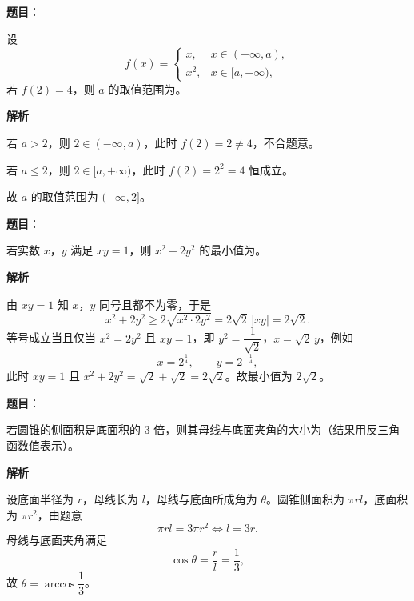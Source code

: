 \begin{answer}

\textbf{题目}：

设
\nopagebreak[4]
\[f(x)=\begin{cases}
x, & x\in(-\infty,a),\\
x^2, & x\in[a,+\infty),
\end{cases}\]
若 $f(2)=4$，则 $a$ 的取值范围为\gkblank{}。

\textbf{解析}

若 $a>2$，则 $2\in(-\infty,a)$，此时 $f(2)=2\neq4$，不合题意。

若 $a\leqslant2$，则 $2\in[a,+\infty)$，此时 $f(2)=2^2=4$ 恒成立。

故 $a$ 的取值范围为 $(-\infty,2]$。

\gkanswer{答案：$(-\infty,2]$。$a\leqslant2$ 时 $2\in[a,+\infty)$，$f(2)=2^2=4$；$a>2$ 时 $f(2)=2\neq4$。}

\end{answer}
\begin{answer}

\textbf{题目}：

若实数 $x$，$y$ 满足 $xy=1$，则 $x^2+2y^2$ 的最小值为\gkblank{}。

\textbf{解析}

由 $xy=1$ 知 $x$，$y$ 同号且都不为零，于是
\nopagebreak[4]
\[x^2+2y^2\geqslant2\sqrt{x^2\cdot2y^2}=2\sqrt2\,|xy|=2\sqrt2 .\]
等号成立当且仅当 $x^2=2y^2$ 且 $xy=1$，即 $y^2=\dfrac1{\sqrt2}$，$x=\sqrt2\,y$，例如
\nopagebreak[4]
\[x=2^{\frac14},\qquad y=2^{-\frac14},\]
此时 $xy=1$ 且 $x^2+2y^2=\sqrt2+\sqrt2=2\sqrt2$。故最小值为 $2\sqrt2$。


\end{answer}
\begin{answer}

\textbf{题目}：

若圆锥的侧面积是底面积的 $3$ 倍，则其母线与底面夹角的大小为\gkblank{}（结果用反三角函数值表示）。

\textbf{解析}

设底面半径为 $r$，母线长为 $l$，母线与底面所成角为 $\theta$。圆锥侧面积为 $\pi rl$，底面积为 $\pi r^2$，由题意
\nopagebreak[4]
\[\pi rl=3\pi r^2\iff l=3r .\]
母线与底面夹角满足
\nopagebreak[4]
\[\cos\theta=\frac rl=\frac13,\]
故 $\theta=\arccos\dfrac13$。


\end{answer}
